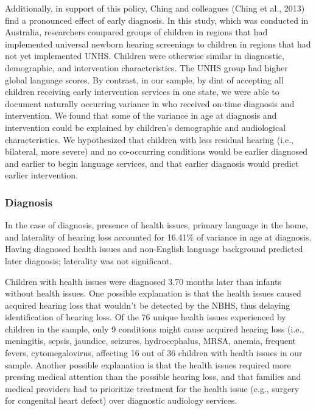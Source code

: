 \documentclass[english,man]{apa6}
\begin{document}
Additionally, in support of this policy, Ching and colleagues (Ching et al., 2013) find a pronounced effect of early diagnosis. In this study, which was conducted in Australia, researchers compared groups of children in regions that had implemented universal newborn hearing screenings to children in regions that had not yet implemented UNHS. Children were otherwise similar in diagnostic, demographic, and intervention characteristics. The UNHS group had higher global language scores. By contrast, in our sample, by dint of accepting all children receiving early intervention services in one state, we were able to document naturally occurring variance in who received on-time diagnosis and intervention. We found that some of the variance in age at diagnosis and intervention could be explained by children's demographic and audiological characteristics. We hypothesized that children with less residual hearing (i.e., bilateral, more severe) and no co-occurring conditions would be earlier diagnosed and earlier to begin language services, and that earlier diagnosis would predict earlier intervention.

\hypertarget{diagnosis}{%
\subsubsection{Diagnosis}\label{diagnosis}}

In the case of diagnosis, presence of health issues, primary language in the home, and laterality of hearing loss accounted for 16.41\% of variance in age at diagnosis. Having diagnosed health issues and non-English language background predicted later diagnosis; laterality was not significant.

Children with health issues were diagnosed 3.70 months later than infants without health issues. One possible explanation is that the health issues caused acquired hearing loss that wouldn't be detected by the NBHS, thus delaying identification of hearing loss. Of the 76 unique health issues experienced by children in the sample, only 9 conditions might cause acquired hearing loss (i.e., meningitis, sepsis, jaundice, seizures, hydrocephalus, MRSA, anemia, frequent fevers, cytomegalovirus, affecting 16 out of 36 children with health issues in our sample. Another possible explanation is that the health issues required more pressing medical attention than the possible hearing loss, and that families and medical providers had to prioritize treatment for the health issue (e.g., surgery for congenital heart defect) over diagnostic audiology services.
\end{document}
